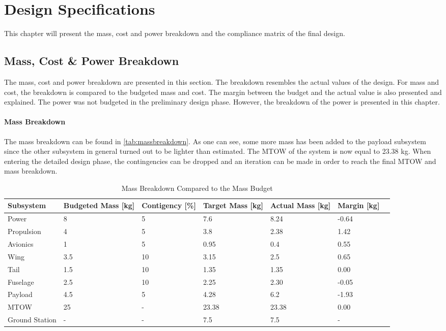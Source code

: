 \chapter{Design Specifications}
\setlength{\parindent}{15pt}
\label{ch:desi_spec}

This chapter will present the mass, cost and power breakdown and the compliance matrix of the final design. 

\section{Mass, Cost \& Power Breakdown}
\label{sec:mass_cost_powe_brea}
The mass, cost and power breakdown are presented in this section. The breakdown resembles the actual values of the design. For mass and cost, the breakdown is compared to the budgeted mass and cost. The margin between the budget and the actual value is also presented and explained. The power was not budgeted in the preliminary design phase. However, the breakdown of the power is presented in this chapter.

\subsubsection{Mass Breakdown}
The mass breakdown can be found in \autoref{tab:massbreakdown}. As one can see, some more mass has been added to the payload subsystem since the other subsystem in general turned out to be lighter than estimated. The MTOW of the system is now equal to 23.38 kg. When entering the detailed design phase, the contingencies can be dropped and an iteration can be made in order to reach the final MTOW and mass breakdown.

\begin{table}[H]
\centering
\caption{Mass Breakdown Compared to the Mass Budget}
\label{tab:massbreakdown}
\begin{tabular}{lp{2cm}lp{2cm}p{2cm}ll}
\toprule
\textbf{Subsystem} & \textbf{Budgeted Mass  [kg]} & \textbf{Contigency [\%]} & \textbf{Target Mass [kg]} & \textbf{Actual Mass [kg]} & \textbf{Margin [kg]} \\ \midrule
Power & 8 & 5 & 7.6 & 8.24 & -0.64 \\\hdashline
Propulsion & 4 & 5 & 3.8 & 2.38 & 1.42 \\\hdashline
Avionics & 1 & 5 & 0.95 & 0.4 & 0.55 \\\hdashline
Wing & 3.5 & 10 & 3.15 & 2.5 & 0.65 \\\hdashline
Tail & 1.5 & 10 & 1.35 & 1.35 & 0.00 \\\hdashline
Fuselage & 2.5 & 10 & 2.25 & 2.30 & -0.05 \\\hdashline
Payload & 4.5 & 5 & 4.28 & 6.2 & -1.93 \\\hline \hline
MTOW & 25 & - & 23.38 & 23.38 & 0.00 \\\hline \hline
Ground Station & - & - & 7.5 & 7.5 & - \\ \bottomrule
\end{tabular}
\end{table}

